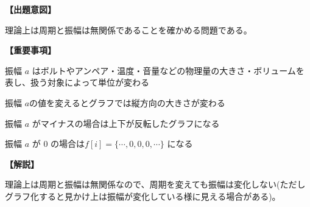 \noindent \textbf{【出題意図】}

\noindent 理論上は周期と振幅は無関係であることを確かめる問題である。

\vspace{1em}
\noindent \textbf{【重要事項】}

\bigskip
\noindent\quad 振幅 $a$ はボルトやアンペア・温度・音量などの物理量の大きさ・ボリュームを表し、扱う対象によって単位が変わる

\bigskip
\noindent\quad 振幅 $a$の値を変えるとグラフでは縦方向の大きさが変わる

\bigskip
\noindent\quad 振幅 $a$ がマイナスの場合は上下が反転したグラフになる

\bigskip
\noindent\quad 振幅 $a$ が $0$ の場合は$f[i]=\{\cdots,0,0,0,\cdots\}$ になる


\vspace{1em}
\noindent \textbf{【解説】}

\noindent 理論上は周期と振幅は無関係なので、周期を変えても振幅は変化しない(ただしグラフ化すると見かけ上は振幅が変化している様に見える場合がある)。
